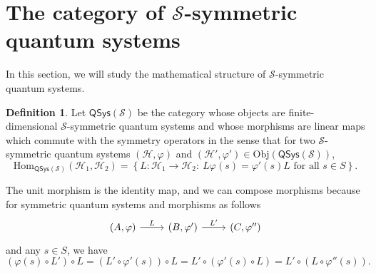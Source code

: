 \documentclass[a4paper,10pt]{scrreprt}
\newcommand{\Obj}{\mathrm{Obj}}
\newcommand{\Hom}{\mathrm{Hom}}
\theoremstyle{definition}
\newtheorem{definition}{Definition}[section]
\theoremstyle{plain}
\theoremstyle{remark}
\begin{document}
\section{The category of $\mathcal{S}$-symmetric quantum systems} \label{sec:categoryofsymmetricquantumsystems}
In this section, we will study the mathematical structure of $\mathcal{S}$-symmetric quantum systems.

\begin{definition}
  \label{def:categoryofsymmetricquantumsystems}
  Let $\mathsf{QSys}(\mathcal{S})$ be the category whose objects are finite-dimensional $\mathcal{S}$-symmetric quantum systems and whose morphisms are linear maps which commute with the symmetry operators in the sense that for two $\mathcal{S}$-symmetric quantum systems $(\mathscr{H}, \varphi)$ and $(\mathscr{H}', \varphi') \in \Obj(\mathsf{QSys}(\mathcal{S}))$, 
  \begin{equation*}
    \Hom_{\mathsf{QSys}(\mathcal{S})}(\mathscr{H}_{1}, \mathscr{H}_{2}) = \left\{ L\colon \mathscr{H}_{1} \to \mathscr{H}_{2}:\ L\varphi(s) = \varphi'(s)L\text{ for all }s \in S \right\}.
  \end{equation*}

  The unit morphism is the identity map, and we can compose morphisms because for symmetric quantum systems and morphisms as follows
  \begin{equation*}
    \begin{tikzcd}
      (A, \varphi)
      \arrow[r, "L"]
      & (B, \varphi')
      \arrow[r, "L'"]
      & (C, \varphi'')
    \end{tikzcd}
  \end{equation*}
  and any $s \in S$, we have 
  \begin{equation*}
    (\varphi(s) \circ L') \circ L = (L' \circ \varphi'(s)) \circ L = L' \circ (\varphi'(s) \circ L) = L' \circ (L \circ \varphi''(s)).
  \end{equation*}
\end{definition}
\end{document}
